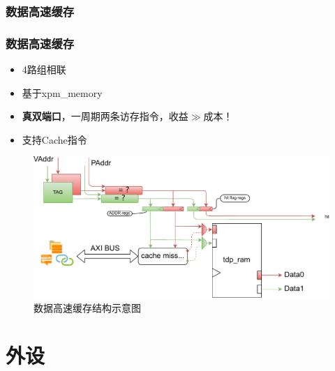 \documentclass{beamer}
\begin{document}
\subsubsection{数据高速缓存}

\begin{frame}
    \frametitle{数据高速缓存}

    \begin{itemize}
        \item 4路组相联
        \item 基于xpm\_memory
        \item \textbf{真双端口}，一周期两条访存指令，收益$\gg$成本！ 
        \item 支持Cache指令
    \end{itemize}

    \begin{figure}
        \centering
        \includegraphics[width=.7\linewidth]{pic/dcache.pdf}
        \caption{数据高速缓存结构示意图}
    \end{figure}

\end{frame}

\section{外设}
\end{document}
